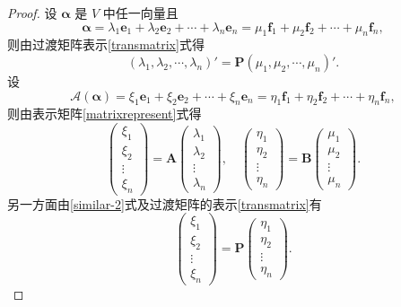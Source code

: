 \documentclass[12pt, a4paper,newtx]{ctexart}
\begin{document}
\begin{proof}
	设 $ \bm \alpha $ 是 $ V $ 中任一向量且
	\[ \bm\alpha = \lambda_1\bm{e}_1 + \lambda_2\bm{e}_2 + \cdots + \lambda_n\bm{e}_n = \mu_1\bm{f}_1 + \mu_2\bm{f}_2 + \cdots + \mu_n\bm{f}_n, \]
	则由过渡矩阵表示\eqref{transmatrix}式得
	\begin{equation}\label{similar-1}
		\left(\lambda_1,\lambda_2,\cdots,\lambda_n\right)' = \bm P \left(\mu_1,\mu_2,\cdots,\mu_n \right)'.
	\end{equation}
	设\begin{equation}\label{similar-2}
		\mathcal{A}(\bm\alpha) = \xi_1\bm{e}_1 + \xi_2\bm{e}_2 + \cdots + \xi_n\bm{e}_n = \eta_1\bm{f}_1 + \eta_2\bm{f}_2 + \cdots + \eta_n\bm{f}_n,
	\end{equation}
	则由表示矩阵\eqref{matrixrepresent}式得
	\begin{equation}\label{similar-3}
		\begin{pmatrix} \xi_1 \\ \xi_2 \\ \vdots \\ \xi_n \end{pmatrix} = \bm A \begin{pmatrix} \lambda_1 \\ \lambda_2 \\ \vdots \\ \lambda_n \end{pmatrix},\quad \begin{pmatrix} \eta_1 \\ \eta_2 \\ \vdots \\ \eta_n \end{pmatrix} = \bm B \begin{pmatrix} \mu_1 \\ \mu_2 \\ \vdots \\ \mu_n \end{pmatrix}.
	\end{equation}
	另一方面由\eqref{similar-2}式及过渡矩阵的表示\eqref{transmatrix}有\begin{equation}\label{similar-4}
		\begin{pmatrix} \xi_1 \\ \xi_2 \\ \vdots \\ \xi_n \end{pmatrix} = \bm P \begin{pmatrix} \eta_1 \\ \eta_2 \\ \vdots \\ \eta_n \end{pmatrix}.

\end{equation}
\end{proof}
\end{document}

